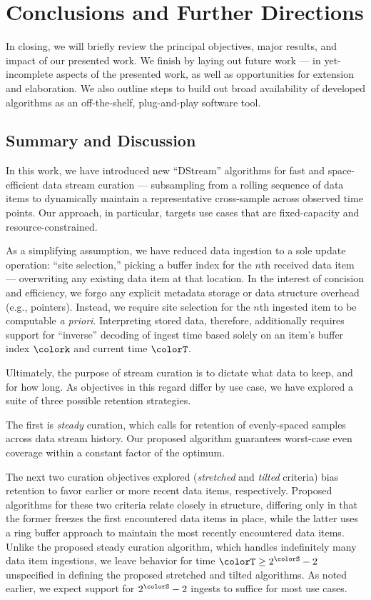 \section{Conclusions and Further Directions} \label{sec:conclusion}

In closing, we will briefly review the principal objectives, major results, and impact of our presented work.
We finish by laying out future work --- in yet-incomplete aspects of the presented work, as well as opportunities for extension and elaboration.
We also outline steps to build out broad availability of developed algorithms as an off-the-shelf, plug-and-play software tool.

\subsection{Summary and Discussion}

In this work, we have introduced new ``DStream'' algorithms for fast and space-efficient data stream curation --- subsampling from a rolling sequence of data items to dynamically maintain a representative cross-sample across observed time points.
Our approach, in particular, targets use cases that are fixed-capacity and resource-constrained.

As a simplifying assumption, we have reduced data ingestion to a sole update operation: ``site selection,'' picking a buffer index for the $n$th received data item --- overwriting any existing data item at that location.
In the interest of concision and efficiency, we forgo any explicit metadata storage or data structure overhead (e.g., pointers).
Instead, we require site selection for the $n$th ingested item to be computable \textit{a priori}.
Interpreting stored data, therefore, additionally requires support for ``inverse'' decoding of ingest time based solely on an item's buffer index $\colork$ and current time $\colorT$.

Ultimately, the purpose of stream curation is to dictate what data to keep, and for how long.
As objectives in this regard differ by use case, we have explored a suite of three possible retention strategies.

The first is \textit{steady} curation, which calls for retention of evenly-spaced samples across data stream history.
Our proposed algorithm guarantees worst-case even coverage within a constant factor of the optimum.

The next two curation objectives explored (\textit{stretched} and \textit{tilted} criteria) bias retention to favor earlier or more recent data items, respectively.
Proposed algorithms for these two criteria relate closely in structure, differing only in that the former freezes the first encountered data items in place, while the latter uses a ring buffer approach to maintain the most recently encountered data items.
Unlike the proposed steady curation algorithm, which handles indefinitely many data item ingestions, we leave behavior for time $\colorT \geq 2^{\colorS} - 2$ unspecified in defining the proposed stretched and tilted algorithms.
As noted earlier, we expect support for $2^{\colorS} - 2$ ingests to suffice for most use cases.

